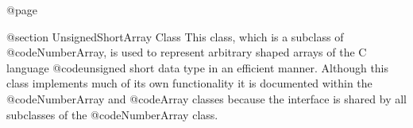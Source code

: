 @page

@section  UnsignedShortArray Class
This class, which is a subclass of @code{NumberArray}, is used to
represent arbitrary shaped arrays of the C language @code{unsigned
short} data type in an efficient manner.  Although this class implements
much of its own functionality it is documented within the
@code{NumberArray} and @code{Array} classes because the interface is
shared by all subclasses of the @code{NumberArray} class.









